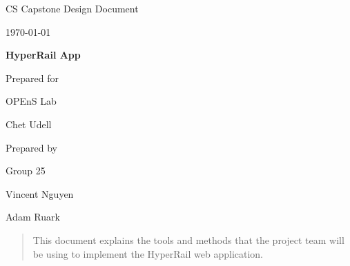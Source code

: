 \documentclass[onecolumn, draftclsnofoot,10pt, compsoc]{IEEEtran}
\def \CapstoneTeamName{		    Team 25}
\def \CapstoneTeamNumber{		25}
\def \GroupMemberOne{			Vincent Nguyen}
\def \GroupMemberTwo{			Adam Ruark}
\def \CapstoneProjectName{		HyperRail App}
\def \CapstoneSponsorCompany{	OPEnS Lab}
\def \CapstoneSponsorPerson{	Chet Udell}
\def \DocType{		
				Design Document
}
\newcommand{\NameSigPair}[1]{\par
\makebox[2.75in][r]{#1} \hfil 	\makebox[3.25in]{\makebox[2.25in]{\hrulefill} \hfill		\makebox[.75in]{\hrulefill}}
\par\vspace{-12pt} \textit{\tiny\noindent
\makebox[2.75in]{} \hfil		\makebox[3.25in]{\makebox[2.25in][r]{Signature} \hfill	\makebox[.75in][r]{Date}}}}
\renewcommand{\NameSigPair}[1]{#1}
\begin{document}
\begin{titlepage}
    \begin{singlespace}
        \hfill 
        \par\vspace{.2in}
        \centering
        \scshape{
            \huge CS Capstone \DocType \par
            {\large\today}\par
            \vspace{.5in}
            \textbf{\Huge\CapstoneProjectName}\par
            \vfill
            {\large Prepared for}\par
            \Huge \CapstoneSponsorCompany\par
            \vspace{5pt}
            {\Large\NameSigPair{\CapstoneSponsorPerson}\par}
            {\large Prepared by }\par
            Group\CapstoneTeamNumber\par
            \vspace{5pt}
            {\Large
                \NameSigPair{\GroupMemberOne}\par
                \NameSigPair{\GroupMemberTwo}\par
            }
            \vspace{20pt}
        }
        \begin{abstract}
        	This document explains the tools and methods that the project team will be using to implement the HyperRail web application.
        \end{abstract}     
    \end{singlespace}
\end{titlepage}
\newpage
{}
\tableofcontents

\clearpage

\end{document}
